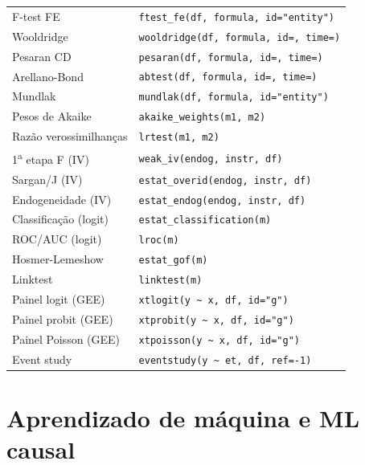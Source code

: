 \begin{center}
\begin{tabular}{ll}
F-test FE           & \texttt{ftest\_fe(df, formula, id="entity")} \\
Wooldridge          & \texttt{wooldridge(df, formula, id=, time=)} \\
Pesaran CD          & \texttt{pesaran(df, formula, id=, time=)} \\
Arellano-Bond       & \texttt{abtest(df, formula, id=, time=)} \\
Mundlak             & \texttt{mundlak(df, formula, id="entity")} \\
Pesos de Akaike     & \texttt{akaike\_weights(m1, m2)} \\
Razão verossimilhanças & \texttt{lrtest(m1, m2)} \\
1\textsuperscript{a} etapa F (IV) & \texttt{weak\_iv(endog, instr, df)} \\
Sargan/J (IV) & \texttt{estat\_overid(endog, instr, df)} \\
Endogeneidade (IV) & \texttt{estat\_endog(endog, instr, df)} \\
Classificação (logit) & \texttt{estat\_classification(m)} \\
ROC/AUC (logit) & \texttt{lroc(m)} \\
Hosmer-Lemeshow & \texttt{estat\_gof(m)} \\
Linktest & \texttt{linktest(m)} \\
Painel logit (GEE) & \texttt{xtlogit(y \textasciitilde{} x, df, id="g")} \\
Painel probit (GEE) & \texttt{xtprobit(y \textasciitilde{} x, df, id="g")} \\
Painel Poisson (GEE) & \texttt{xtpoisson(y \textasciitilde{} x, df, id="g")} \\
Event study & \texttt{eventstudy(y \textasciitilde{} et, df, ref=-1)} \\
\bottomrule
\end{tabular}
\end{center}

\section{Aprendizado de máquina e ML causal}

